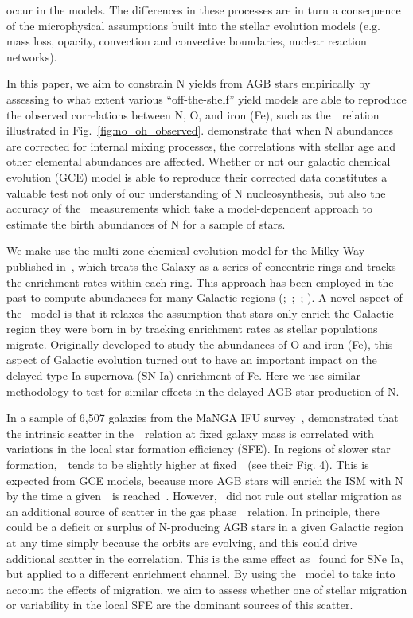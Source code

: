 \documentclass[ms.tex]{subfiles}
\begin{document}
occur in the models.
The differences in these processes are in turn a consequence of the
microphysical assumptions built into the stellar evolution models (e.g. mass
loss, opacity, convection and convective boundaries, nuclear reaction networks).
\par
In this paper, we aim to constrain N yields from AGB stars empirically by
assessing to what extent various ``off-the-shelf'' yield models are able to
reproduce the observed correlations between N, O, and iron (Fe), such as
the~\ohno~relation illustrated in Fig.~\ref{fig:no_oh_observed}.
\citet{Vincenzo2021} demonstrate that when N abundances are corrected for
internal mixing processes, the correlations with stellar age and other
elemental abundances are affected.
Whether or not our galactic chemical evolution (GCE) model is able to reproduce
their corrected data constitutes a valuable test not only of our understanding
of N nucleosynthesis, but also the accuracy of the~\citet{Vincenzo2021}
measurements which take a model-dependent approach to estimate the birth
abundances of N for a sample of stars.
\par
We make use the multi-zone chemical evolution model for the Milky Way
published in~\citet{Johnson2021}, which treats the Galaxy as a series of
concentric rings and tracks the enrichment rates within each ring.
This approach has been employed in the past to compute abundances for many
Galactic regions (\citealp{Matteucci1989, Wyse1989, Prantzos1995,
Schoenrich2009};~\citealp*{Minchev2013, Minchev2014};~\citealp{Minchev2017};
\citealp*{Sharma2021}).
A novel aspect of the~\citet{Johnson2021} model is that it relaxes the
assumption that stars only enrich the Galactic region they were born in by
tracking enrichment rates as stellar populations migrate.
Originally developed to study the abundances of O and iron (Fe), this aspect of
Galactic evolution turned out to have an important impact on the delayed type
Ia supernova (SN Ia) enrichment of Fe.
Here we use similar methodology to test for similar effects in the delayed AGB
star production of N.
\par
In a sample of 6,507 galaxies from the MaNGA IFU survey~\citep{Bundy2015},
\citet{Schaefer2020} demonstrated that the intrinsic scatter in
the~\ohno~relation at fixed galaxy mass is correlated with variations in the
local star formation efficiency (SFE).
In regions of slower star formation,~\no~tends to be slightly higher at
fixed~\oh~(see their Fig. 4).
This is expected from GCE models, because more AGB stars will enrich the ISM
with N by the time a given~\oh~is reached~\citep[e.g.][]{Molla2006,
Vincenzo2016a}.
However,~\citet{Schaefer2020} did not rule out stellar migration as an
additional source of scatter in the gas phase~\ohno~relation.
In principle, there could be a deficit or surplus of N-producing AGB stars in a
given Galactic region at any time simply because the orbits are evolving, and
this could drive additional scatter in the correlation.
This is the same effect as~\citet{Johnson2021} found for SNe Ia, but applied to
a different enrichment channel.
By using the~\citet{Johnson2021} model to take into account the effects of
migration, we aim to assess whether one of stellar migration or variability in
the local SFE are the dominant sources of this scatter.
\end{document}
